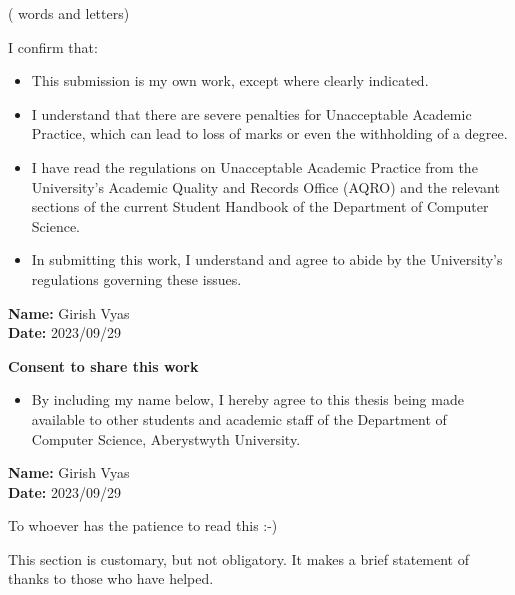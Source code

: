 \documentclass{main}
\newcounter{wordcount}
\newcounter{lettercount}
\begin{document}
\begin{singlespace}
\endcountem
(\thewordcount{} words and \thelettercount{} letters)


  I confirm that:\\
  \begin{itemize}
    \item This submission is my own work, except where clearly indicated.
    \item I understand that there are severe penalties for Unacceptable Academic Practice, which can lead to loss of marks or even the withholding of a degree.
    \item I have read the regulations on Unacceptable Academic Practice from the University’s Academic Quality and Records Office (AQRO) and the relevant    sections of the current Student Handbook of the Department of Computer Science.
    \item In submitting this work, I understand and agree to abide by the University’s regulations governing these issues.
  \end{itemize}
  \vspace{10pt}
  \textbf{Name:} Girish Vyas\\
  \textbf{Date:} 2023/09/29
  \vspace{50pt}

  \begin{center}
    \textbf{Consent to share this work}
  \end{center}
  \begin{itemize}
    \item By including my name below, I hereby agree to this thesis being made available to other students and academic staff of the Department of Computer Science, Aberystwyth University.
  \end{itemize}

  \vspace{10pt}
  \textbf{Name:} Girish Vyas\\
  \textbf{Date:} 2023/09/29






  \null\vskip1.5in
  \begin{center}

    To whoever has the patience to read this :-)

    This section is customary, but not obligatory.  It makes a brief statement of thanks to those who have helped.

  \end{center}

  \afterpreface

\end{singlespace}
\end{document}
